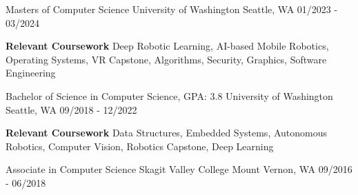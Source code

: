 
\begin{cventries}
  \cventry
    {Masters of Computer Science} %
    {University of Washington} %
    {Seattle, WA} %
    {01/2023 - 03/2024} %
    {
      \begin{cvitems} %
         \item {\textbf{Relevant Coursework} \newline Deep Robotic Learning, AI-based Mobile Robotics, Operating Systems, VR Capstone, Algorithms, Security, Graphics, Software Engineering}
      \end{cvitems}
    }
  \cventry
    {Bachelor of Science in Computer Science, GPA: 3.8} %
    {University of Washington} %
    {Seattle, WA} %
    {09/2018 - 12/2022} %
    {
      \begin{cvitems} %
         \item {\textbf{Relevant Coursework} \newline Data Structures, Embedded Systems, Autonomous Robotics, Computer Vision, Robotics Capstone, Deep Learning}
      \end{cvitems}
    }
  \cventry
    {Associate in Computer Science} %
    {Skagit Valley College} %
    {Mount Vernon, WA} %
    {09/2016 - 06/2018} %
    {}
\end{cventries}

